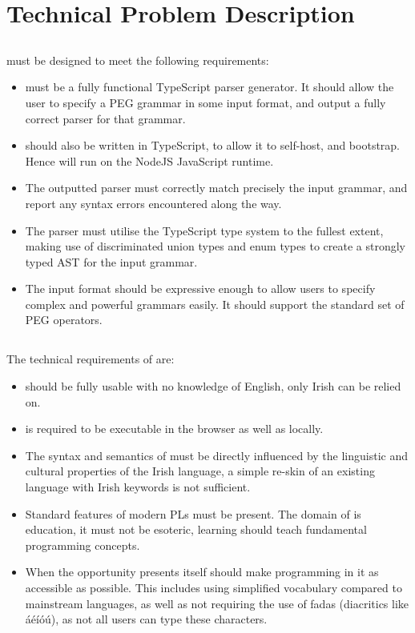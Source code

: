 \chapter{Technical Problem Description}
\section{\tsPEG{}}
\tsPEG{} must be designed to meet the following requirements:

 \begin{itemize}
     \item \tsPEG{} must be a fully functional TypeScript parser generator. It should allow the user to specify a PEG grammar in some input format, and output a fully correct parser for that grammar.
 
     \item \tsPEG{} should also be written in TypeScript, to allow it to self-host, and bootstrap. Hence \tsPEG{} will run on the NodeJS JavaScript runtime.
 
     \item The outputted parser must correctly match precisely the input grammar, and report any syntax errors encountered along the way.
 
     \item The parser must utilise the TypeScript type system to the fullest extent, making use of discriminated union types and enum types to create a strongly typed AST for the input grammar.
 
     \item The \tsPEG{} input format should be expressive enough to allow users to specify complex and powerful grammars easily. It should support the standard set of PEG operators.
 \end{itemize}

\section{\Setanta{}}

The technical requirements of \Setanta{} are:
\begin{itemize}
    \item \Setanta{} should be fully usable with no knowledge of English, only Irish can be relied on.
    \item \Setanta{} is required to be executable in the browser as well as locally.
    \item The syntax and semantics of \Setanta{} must be directly influenced by the linguistic and cultural properties of the Irish language, a simple re-skin of an existing language with Irish keywords is not sufficient.
    \item Standard features of modern PLs must be present. The domain of \Setanta{} is education, it must not be esoteric, learning \Setanta{} should teach fundamental programming concepts.
    \item When the opportunity presents itself \Setanta{} should make programming in it as accessible as possible. This includes using simplified vocabulary compared to mainstream languages, as well as not requiring the use of fadas (diacritics like áéíóú), as not all users can type these characters.
\end{itemize}

